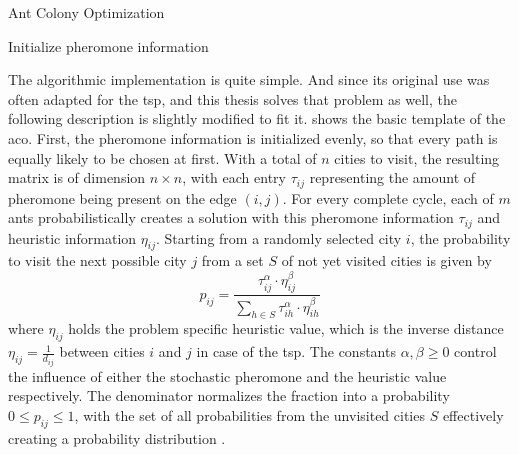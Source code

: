 \begin{algorithm}
	\caption{Ant Colony Optimization}
	\label{alg:aco}
	
	\begin{algorithmic}
		\State Initialize pheromone information
		\Repeat
		\State {}
		\EndFor
		\State {}
		\State {}
		\EndProcedure
	\end{algorithmic}
\end{algorithm}

The algorithmic implementation is quite simple. And since its original use was often adapted for the \gls{tsp}, and this thesis solves that problem as well, the following description is slightly modified to fit it.
 shows the basic template of the \gls{aco}. First, the pheromone information is initialized evenly, so that every path is equally likely to be chosen at first. With a total of $n$ cities to visit, the resulting matrix is of dimension $n \times n$, with each entry $\tau_{ij}$ representing the amount of pheromone being present on the edge $(i,j)$.
For every complete cycle, each of $m$ ants probabilistically creates a solution with this pheromone information $\tau_{ij}$ and heuristic information $\eta_{ij}$. Starting from a randomly selected city $i$, the probability to visit the next possible city $j$ from a set $S$ of not yet visited cities is given by 
\begin{equation}
		\label{eq:aco_prob}
		p_{ij} = \frac{\tau_{ij}^\alpha \cdot \eta_{ij}^\beta}{\sum_{h \in S} \tau_{ih}^\alpha \cdot \eta_{ih}^\beta}
\end{equation}
where $\eta_{ij}$ holds the problem specific heuristic value, which is the inverse distance $\eta_{ij} = \frac{1}{d_{ij}}$ between cities $i$ and $j$ in case of the \gls{tsp}. The constants $\alpha, \beta \geq 0$ control the influence of either the stochastic pheromone and the heuristic value respectively. The denominator normalizes the fraction into a probability $0 \leq p_{ij} \leq 1$, with the set of all probabilities from the unvisited cities $S$ effectively creating a probability distribution \cite{talbi2009metaheuristics}.

